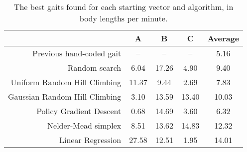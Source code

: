 \begin{table}
\begin{center}
\begin{tabular}{|r|c|c|c||c|}
\hline
                                         & A       & B      & C      &  Average \\
\hline                                                               
\hline                                                               
Previous hand-coded gait                 & --      & --     & --     &  5.16 \\
\hline                                                                 
Random search                            & 6.04    & 17.26  & 4.90   &  9.40 \\
\hline                                                                 
Uniform Random Hill Climbing             & 11.37   & 9.44   & 2.69   &  7.83 \\
\hline                                                                 
Gaussian Random Hill Climbing            & 3.10    & 13.59  & 13.40  &  10.03 \\
\hline                                                                 
Policy Gradient Descent                  & 0.68    & 14.69  & 3.60   &  6.32 \\
\hline                                                                 
Nelder-Mead simplex                      & 8.51    & 13.62  & 14.83  &  12.32 \\
\hline                                                                 
Linear Regression                        & 27.58   & 12.51  & 1.95   &  14.01 \\
\hline
\end{tabular}
\caption{The best gaits found for each starting vector and algorithm,
  in body lengths per minute.}
\end{center}
\end{table}


